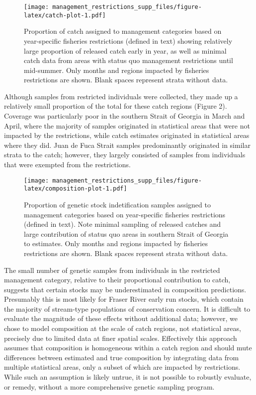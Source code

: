 \documentclass[
]{article}
\begin{document}
\begin{figure}
\centering
\texttt{[image: management\_restrictions\_supp\_files/figure-latex/catch-plot-1.pdf]}
\caption{Proportion of catch assigned to management categories based on
year-specific fisheries restrictions (defined in text) showing
relatively large proportion of released catch early in year, as well as
minimal catch data from areas with status quo management restrictions
until mid-summer. Only months and regions impacted by fisheries
restrictions are shown. Blank spaces represent strata without data.}
\end{figure}

Although samples from restricted individuals were collected, they made
up a relatively small proportion of the total for these catch regions
(Figure 2). Coverage was particularly poor in the southern Strait of
Georgia in March and April, where the majority of samples originated in
statistical areas that were not impacted by the restrictions, while
catch estimates originated in statistical areas where they did. Juan de
Fuca Strait samples predominantly originated in similar strata to the
catch; however, they largely consisted of samples from individuals that
were exempted from the restrictions.

\begin{figure}
\centering
\texttt{[image: management\_restrictions\_supp\_files/figure-latex/composition-plot-1.pdf]}
\caption{Proportion of genetic stock indetification samples assigned to
management categories based on year-specific fisheries restrictions
(defined in text). Note minimal sampling of released catches and large
contribution of status quo areas in southern Strait of Georgia to
estimates. Only months and regions impacted by fisheries restrictions
are shown. Blank spaces represent strata without data.}
\end{figure}

The small number of genetic samples from individuals in the restricted
management category, relative to their proportional contribution to
catch, suggests that certain stocks may be underestimated in composition
predictions. Presumably this is most likely for Fraser River early run
stocks, which contain the majority of stream-type populations of
conservation concern. It is difficult to evaluate the magnitude of these
effects without additional data; however, we chose to model composition
at the scale of catch regions, not statistical areas, precisely due to
limited data at finer spatial scales. Effectively this approach assumes
that composition is homogeneous within a catch region and should mute
differences between estimated and true composition by integrating data
from multiple statistical areas, only a subset of which are impacted by
restrictions. While such an assumption is likely untrue, it is not
possible to robustly evaluate, or remedy, without a more comprehensive
genetic sampling program.
\end{document}
